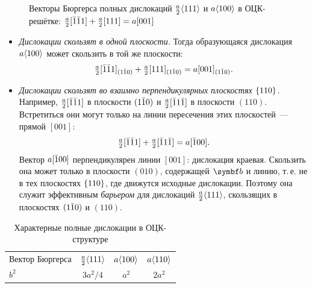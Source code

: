 \begin{figure}[ht]
\centering
{}
\caption{Векторы Бюргерса полных дислокаций $\frac a2\langle 111\rangle$ и
$a\langle 100\rangle$ в ОЦК-решётке: $\frac a2[\bar{1}\bar{1}1]+\frac a2[111]=a[001]$}
\label{fig:bcc-reaction}
\end{figure}

\begin{itemize}
\item \emph{Дислокации скользят в одной плоскости.} Тогда образующаяся
дислокация $a\langle 100\rangle$ может скользить в той же плоскости:
\[
\tfrac a2[\bar{1}\bar{1}1]_{(1\bar{1}0)}+\tfrac a2[111]_{(1\bar{1}0)}=a[001]_{(1\bar{1}0)} .
\]
\item \emph{Дислокации скользят во взаимно перпендикулярных плоскостях
$\{110\}$.} Например, $\frac a2[\bar{1}\bar{1}1]$ в плоскости $(1\bar{1}0)$ и
$\frac a2[\bar{1}1\bar{1}]$ в плоскости $(110)$. Встретиться они могут только на
линии пересечения этих плоскостей~— прямой $[001]$:
\[
\tfrac a2[\bar{1}\bar{1}1]+\tfrac a2[\bar{1}1\bar{1}]=a[\bar{1}00] .
\]
Вектор $a[\bar{1}00]$ перпендикулярен линии $[001]$: дислокация краевая.
Скользить она может только в плоскости $(010)$, содержащей $\vb b$ и
линию, т.\,е. не в тех плоскостях $\{110\}$, где движутся исходные
дислокации. Поэтому она служит эффективным \emph{барьером} для
дислокаций $\frac a2\langle 111\rangle$, скользящих в плоскостях $(1\bar{1}0)$ и
$(110)$.
\end{itemize}

\begin{table}[ht]
\centering
\caption{Характерные полные дислокации в ОЦК-структуре}
\label{tab:bcc-full}
\small
\begin{tabular}{@{}lccc@{}}
\toprule
Вектор Бюргерса & $\frac a2\langle 111\rangle$ & $a\langle 100\rangle$ & $a\langle 110\rangle$ \\
$b^2$ & $3a^2/4$ & $a^2$ & $2a^2$ \\
\bottomrule
\end{tabular}
\end{table}

